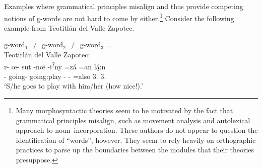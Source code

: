 \documentclass[output=paper,hidelinks]{langscibook}
\begin{document}

Examples where grammatical principles misalign and thus provide competing notions of g-words are not hard to come by either.\footnote{Many morphosyntactic theories seem to be motivated by the fact that grammatical principles misalign, such as  movement analysis and  autolexical approach to noun{--}incorporation. These authors do not appear to question the identification of ``words'', however. They seem to rely heavily on orthographic practices to parse up the boundaries between the modules that their theories presuppose.}  Consider the following example from Teotitlán del Valle Zapotec.




\ea \label{ex:tlvzapotec2}
g-word$_1$ $\neq$ g-word$_2$ $\neq$ g-word$_3$ ...  \\
Teotitlán del Valle Zapotec: \\
\gll r- œ- sut -nœ̄ -i\textsuperscript{ʔ}ny =zá =an lǎ̰:n \\
 \Hab{}- going- going:play -\Com{} -\Dim{} =also 3\Sg{}.\Inf{} 3\Sg{}.\Inf{} \\
\glt `S/he goes to play with him/her (how nice!).' 
\z 
\end{document}
